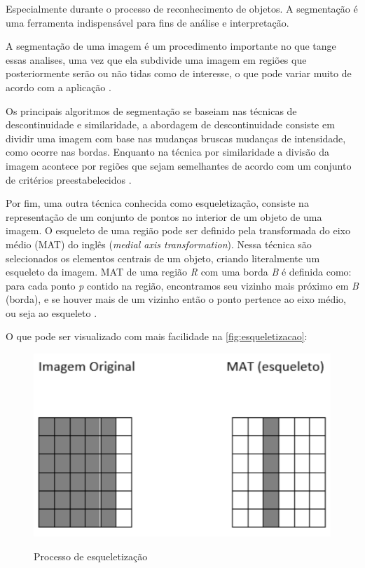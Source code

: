 Especialmente durante o processo de reconhecimento de objetos. 
A segmentação é uma ferramenta indispensável para fins de análise e interpretação.

A segmentação de uma imagem é um procedimento importante no que tange
essas analises, uma vez que ela subdivide uma imagem em regiões que
posteriormente serão ou não tidas como de interesse, o que pode variar muito de
acordo com a aplicação \cite{gonzalez2010}.

Os principais algoritmos de segmentação se baseiam nas técnicas de
descontinuidade e similaridade, a abordagem de descontinuidade consiste em dividir
uma imagem com base nas mudanças bruscas mudanças de intensidade, como
ocorre nas bordas. Enquanto na técnica por similaridade a divisão da imagem
acontece por regiões que sejam semelhantes de acordo com um conjunto de critérios
preestabelecidos \cite{gonzalez2010}.

Por fim, uma outra técnica conhecida como esqueletização, 
consiste na representação de um conjunto de pontos no interior de um 
objeto de uma imagem. O esqueleto de uma região pode
ser definido pela transformada do eixo médio (MAT) do inglês (\textit{medial axis
transformation}). Nessa técnica são selecionados os elementos centrais de um objeto,
criando literalmente um esqueleto da imagem. MAT de uma região \textit{R} com uma borda
\textit{B} é definida como: para cada ponto \textit{p} contido na região, encontramos seu vizinho
mais próximo em \textit{B} (borda), e se houver mais de um vizinho então o ponto pertence
ao eixo médio, ou seja ao esqueleto \cite{gonzalez2010}.

O que pode ser visualizado com mais facilidade na \autoref{fig:esqueletizacao}:

\begin{figure}[h!]
    \centering
    \caption{Processo de esqueletização}
    \includegraphics[scale=0.25]{figuras/esqueletizacao.png} 
    \fonte{}%
    \label{fig:esqueletizacao}
    \centering
\end{figure}

